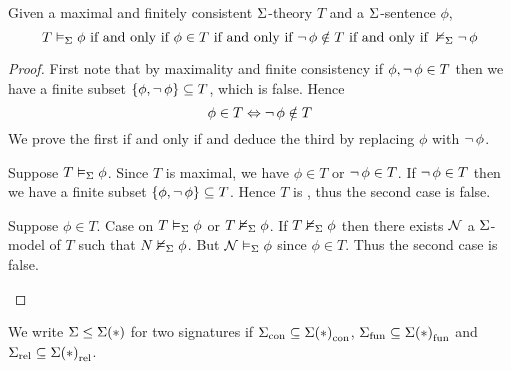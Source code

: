 \begin{prop}
    Given a maximal and finitely consistent $\Sigma$-theory $T$ and
    a $\Sigma$-sentence $\phi$, 
    \[ T \vDash_{\Sigma} \phi \text{ if and only if } \phi \in T
    \text{ if and only if } \neg\, \phi \notin T
    \text{ if and only if } \nvDash_{\Sigma} \neg\, \phi\]   
\end{prop}
\begin{proof}
    First note that by maximality and finite consistency
    if $\phi, \neg\, \phi \in T$ then we have a finite 
     subset 
    $\left\{\phi,\neg\, \phi\right\} \subseteq T$, which is false. 
    Hence
    \[\phi \in T \Leftrightarrow \neg\, \phi \notin T\]
    We prove the first if and only if and deduce the third by 
    replacing $\phi$ with $\neg\, \phi$.
        \begin{forward}
            Suppose $T \vDash_{\Sigma} \phi$.
            Since $T$ is maximal, 
            we have $\phi \in T$ or $\neg\, \phi \in T$.
            If $\neg\, \phi \in T$ then we have a finite subset 
            $\left\{\phi,\neg\, \phi\right\} \subseteq T$.
            Hence $T$ is ,  
            thus the second case is false.
        \end{forward}
        \begin{backward}
            Suppose $\phi \in T$. 
            Case on $T \vDash_{\Sigma} \phi$ or $T \nvDash_{\Sigma} \phi$.
            If $T \nvDash_{\Sigma} \phi$ then there exists 
            $\mathcal{N}$ a $\Sigma$-model of $T$ such that 
            $N \nvDash_{\Sigma} \phi$.
            But $\mathcal{N} \vDash_{\Sigma} \phi$ since $\phi \in T$.
            Thus the second case is false.
        \end{backward}
\end{proof}

\begin{nttn}
    We write $\Sigma \leq \Sigma(*)$ for two signatures if
    ${\Sigma}_\mathrm{con} \subseteq {\Sigma(*)}_\mathrm{con}$,
    ${\Sigma}_\mathrm{fun} \subseteq {\Sigma(*)}_\mathrm{fun}$ and ${\Sigma}_\mathrm{rel} \subseteq {\Sigma(*)}_\mathrm{rel}$.
\end{nttn}

